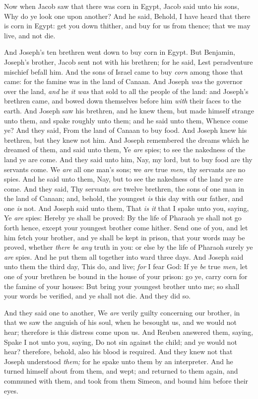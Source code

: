 \documentclass[11pt,letterpaper,oneside]{memoir}
\begin{document}
Now when Jacob saw that there was corn in Egypt, Jacob said unto his
sons, Why do ye look one upon another? And he said, Behold, I have heard
that there is corn in Egypt: get you down thither, and buy for us from
thence; that we may live, and not die.

And Joseph's ten brethren went down to buy corn in Egypt. But Benjamin,
Joseph's brother, Jacob sent not with his brethren; for he said, Lest
peradventure mischief befall him. And the sons of Israel came to buy
\emph{corn} among those that came: for the famine was in the land of
Canaan. And Joseph \emph{was} the governor over the land, \emph{and} he
\emph{it was} that sold to all the people of the land: and Joseph's
brethren came, and bowed down themselves before him \emph{with} their
faces to the earth. And Joseph saw his brethren, and he knew them, but
made himself strange unto them, and spake roughly unto them; and he said
unto them, Whence come ye? And they said, From the land of Canaan to buy
food. And Joseph knew his brethren, but they knew not him. And Joseph
remembered the dreams which he dreamed of them, and said unto them, Ye
\emph{are} spies; to see the nakedness of the land ye are come. And they
said unto him, Nay, my lord, but to buy food are thy servants come. We
\emph{are} all one man's sons; we \emph{are} true \emph{men,} thy
servants are no spies. And he said unto them, Nay, but to see the
nakedness of the land ye are come. And they said, Thy servants
\emph{are} twelve brethren, the sons of one man in the land of Canaan;
and, behold, the youngest \emph{is} this day with our father, and one
\emph{is} not. And Joseph said unto them, That \emph{is it} that I spake
unto you, saying, Ye \emph{are} spies: Hereby ye shall be proved: By the
life of Pharaoh ye shall not go forth hence, except your youngest
brother come hither. Send one of you, and let him fetch your brother,
and ye shall be kept in prison, that your words may be proved, whether
\emph{there be any} truth in you: or else by the life of Pharaoh surely ye
\emph{are} spies. And he put them all together into ward three days. And
Joseph said unto them the third day, This do, and live; \emph{for} I
fear God: If ye \emph{be} true \emph{men,} let one of your brethren be
bound in the house of your prison: go ye, carry corn for the famine of
your houses: But bring your youngest brother unto me; so shall your
words be verified, and ye shall not die. And they did so.

And they said one to another, We \emph{are} verily guilty concerning our
brother, in that we saw the anguish of his soul, when he besought us,
and we would not hear; therefore is this distress come upon us. And
Reuben answered them, saying, Spake I not unto you, saying, Do not sin
against the child; and ye would not hear? therefore, behold, also his
blood is required. And they knew not that Joseph understood \emph{them;}
for he spake unto them by an interpreter. And he turned himself about
from them, and wept; and returned to them again, and communed with them,
and took from them Simeon, and bound him before their eyes.
\end{document}
